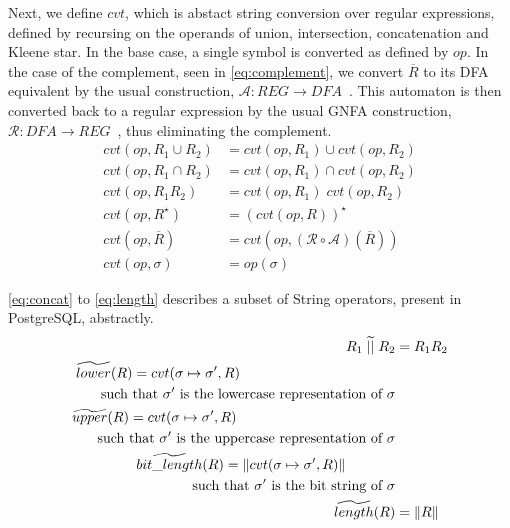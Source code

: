 Next, we define $cvt$, which is abstact string conversion over regular expressions, defined by recursing on the operands of union, intersection, concatenation and Kleene star.
In the base case, a single symbol is converted as defined by $op$.
In the case of the complement, seen in \autoref{eq:complement}, we convert $\overline{R}$ to its DFA equivalent by the usual construction, $\mathcal{A}:REG\rightarrow DFA$~\cite{sipserbook}.
This automaton is then converted back to a regular expression by the usual GNFA construction, $\mathcal{R}: DFA\rightarrow REG$~\cite{sipserbook}, thus eliminating the complement.
\begin{align}
    cvt(op, R_1 \cup R_2) &= cvt(op, R_1) \cup cvt(op, R_2) \\
    cvt(op, R_1 \cap R_2) &= cvt(op, R_1) \cap cvt(op, R_2) \\
    cvt(op, R_1R_2) &= cvt(op, R_1) \; cvt(op, R_2) \\
    cvt(op, R^\star) &= (cvt(op, R))^\star \\
    cvt(op, \overline{R}) &= cvt(op, (\mathcal{R} \circ \mathcal{A}) (\overline{R})) \label{eq:complement} \\
    cvt(op, \sigma) &= op(\sigma)
\end{align}

\autoref{eq:concat} to \ref{eq:length} describes a subset of String operators, present in PostgreSQL, abstractly.
\begin{align}\label{eq:concat}
    R_1 \;\aab{||}\; R_2 &= R_1R_2 \\
    \begin{split}
        \aab{lower}(R) &= cvt(\sigma \mapsto \sigma', R) \\
        \text{such } &\text{that } \sigma' \text{ is the lowercase representation of } \sigma
    \end{split}\\
    \begin{split}
        \aab{upper}(R) &= cvt(\sigma \mapsto \sigma', R) \\
        \text{such } &\text{that $\sigma'$ is the uppercase representation of $\sigma$}
    \end{split}\\
    \begin{split}
        \aab{bit\_length}(R) &= \|cvt(\sigma \mapsto \sigma', R)\| \\
        \text{such } &\text{that $\sigma'$ is the bit string of $\sigma$}
    \end{split} \\ \label{eq:length}
    \aab{length}(R) &= \|R\|
\end{align}

